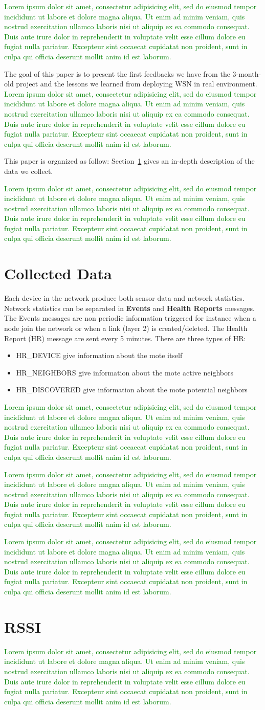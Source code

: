 \documentclass{sig-alternate}
\newcommand{\lorem}               {\textcolor{green}{Lorem ipsum dolor sit amet, consectetur adipisicing elit, sed do eiusmod tempor incididunt ut labore et dolore magna aliqua. Ut enim ad minim veniam, quis nostrud exercitation ullamco laboris nisi ut aliquip ex ea commodo consequat. Duis aute irure dolor in reprehenderit in voluptate velit esse cillum dolore eu fugiat nulla pariatur. Excepteur sint occaecat cupidatat non proident, sunt in culpa qui officia deserunt mollit anim id est laborum.}}
\begin{document}
\lorem


The goal of this paper is to present the first feedbacks we have from the 3-month-old project and the lessons we learned from deploying WSN in real environment.
\lorem

This paper is organized as follow:
Section~\ref{sec:collected} gives an in-depth description of the data we collect.

\lorem

\section{Collected Data}
\label{sec:collected}


Each device in the network produce both sensor data and network statistics.
Network statistics can be separated in \textbf{Events} and \textbf{Health Reports} messages.
The Events messages are non periodic information triggered for instance when a node join the network or when a link (layer 2) is created/deleted.
The Health Report (HR) message are sent every 5 minutes.
There are three types of HR:
\begin{itemize}
  \item HR\_DEVICE give information about the mote itself
  \item HR\_NEIGHBORS give information about the mote active neighbors
  \item HR\_DISCOVERED give information about the mote potential neighbors
\end{itemize}


\lorem


\lorem


\lorem

\section{RSSI}
\label{sec:rssi}


\lorem

\end{document}
